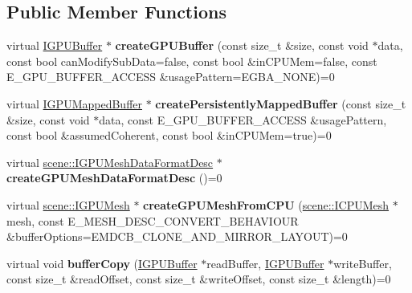 \subsection*{Public Member Functions}
\begin{DoxyCompactItemize}
\item 
virtual \hyperlink{classirr_1_1video_1_1IGPUBuffer}{I\+G\+P\+U\+Buffer} $\ast$ {\bfseries create\+G\+P\+U\+Buffer} (const size\+\_\+t \&size, const void $\ast$data, const bool can\+Modify\+Sub\+Data=false, const bool \&in\+C\+P\+U\+Mem=false, const E\+\_\+\+G\+P\+U\+\_\+\+B\+U\+F\+F\+E\+R\+\_\+\+A\+C\+C\+E\+SS \&usage\+Pattern=E\+G\+B\+A\+\_\+\+N\+O\+NE)=0\hypertarget{classirr_1_1video_1_1IVideoDriver_ad8cfbfe854ca31d578870cb2dedfe1a3}{}\label{classirr_1_1video_1_1IVideoDriver_ad8cfbfe854ca31d578870cb2dedfe1a3}

\item 
virtual \hyperlink{classirr_1_1video_1_1IGPUMappedBuffer}{I\+G\+P\+U\+Mapped\+Buffer} $\ast$ {\bfseries create\+Persistently\+Mapped\+Buffer} (const size\+\_\+t \&size, const void $\ast$data, const E\+\_\+\+G\+P\+U\+\_\+\+B\+U\+F\+F\+E\+R\+\_\+\+A\+C\+C\+E\+SS \&usage\+Pattern, const bool \&assumed\+Coherent, const bool \&in\+C\+P\+U\+Mem=true)=0\hypertarget{classirr_1_1video_1_1IVideoDriver_a62005b92bf8cd24c1fd1a08ddfd4faec}{}\label{classirr_1_1video_1_1IVideoDriver_a62005b92bf8cd24c1fd1a08ddfd4faec}

\item 
virtual \hyperlink{classirr_1_1scene_1_1IMeshDataFormatDesc}{scene\+::\+I\+G\+P\+U\+Mesh\+Data\+Format\+Desc} $\ast$ {\bfseries create\+G\+P\+U\+Mesh\+Data\+Format\+Desc} ()=0\hypertarget{classirr_1_1video_1_1IVideoDriver_a29e5b923cdc8ec2d6d265e317608e368}{}\label{classirr_1_1video_1_1IVideoDriver_a29e5b923cdc8ec2d6d265e317608e368}

\item 
virtual \hyperlink{classirr_1_1scene_1_1IMesh}{scene\+::\+I\+G\+P\+U\+Mesh} $\ast$ {\bfseries create\+G\+P\+U\+Mesh\+From\+C\+PU} (\hyperlink{classirr_1_1scene_1_1IMesh}{scene\+::\+I\+C\+P\+U\+Mesh} $\ast$mesh, const E\+\_\+\+M\+E\+S\+H\+\_\+\+D\+E\+S\+C\+\_\+\+C\+O\+N\+V\+E\+R\+T\+\_\+\+B\+E\+H\+A\+V\+I\+O\+UR \&buffer\+Options=E\+M\+D\+C\+B\+\_\+\+C\+L\+O\+N\+E\+\_\+\+A\+N\+D\+\_\+\+M\+I\+R\+R\+O\+R\+\_\+\+L\+A\+Y\+O\+UT)=0\hypertarget{classirr_1_1video_1_1IVideoDriver_a7a40fc1ab509af104a505e394ce61ac2}{}\label{classirr_1_1video_1_1IVideoDriver_a7a40fc1ab509af104a505e394ce61ac2}

\item 
virtual void {\bfseries buffer\+Copy} (\hyperlink{classirr_1_1video_1_1IGPUBuffer}{I\+G\+P\+U\+Buffer} $\ast$read\+Buffer, \hyperlink{classirr_1_1video_1_1IGPUBuffer}{I\+G\+P\+U\+Buffer} $\ast$write\+Buffer, const size\+\_\+t \&read\+Offset, const size\+\_\+t \&write\+Offset, const size\+\_\+t \&length)=0\hypertarget{classirr_1_1video_1_1IVideoDriver_adb4634036e04db7614a0cf0f18030333}{}\label{classirr_1_1video_1_1IVideoDriver_adb4634036e04db7614a0cf0f18030333}


\end{DoxyCompactItemize}
